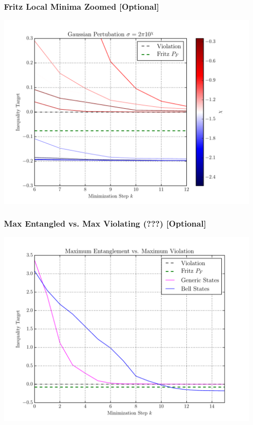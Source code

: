\documentclass[
    hyperref={bookmarks=false},%
    xcolor={dvipsnames},
]{beamer}
\begin{document}
\begin{frame}
    \frametitle{Fritz Local Minima Zoomed [Optional]}
    \includegraphics[width=\linewidth]{../../figures/optimizations/Gaussian_Perturbation_Fritz_Color_Zoomed.pdf}
\end{frame}

\begin{frame}
    \frametitle{Max Entangled vs. Max Violating (???) [Optional]}
    \includegraphics[width=\linewidth]{../../figures/optimizations/Max_Entanglement_vs_Max_Violation_random_seed.pdf}
\end{frame}
\end{document}
